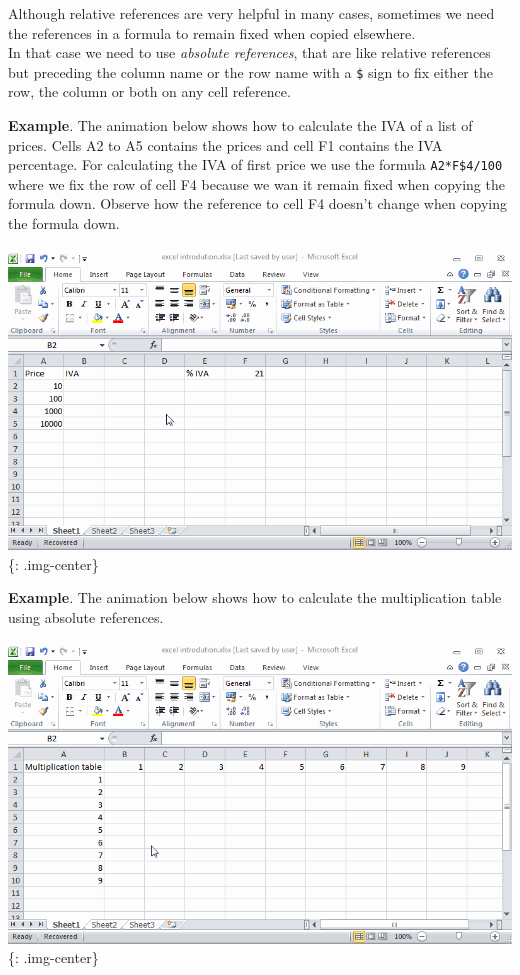 Although relative references are very helpful in many cases, sometimes we need the references in a formula to remain fixed when copied elsewhere.\\
In that case we need to use \emph{absolute references}, that are like relative references but preceding the column name or the row name with a \texttt{\$} sign to fix either the row, the column or both on any cell reference.

\textbf{Example}. The animation below shows how to calculate the IVA of a list of prices. Cells A2 to A5 contains the prices and cell F1 contains the IVA percentage. For calculating the IVA of first price we use the formula \texttt{A2*F\$4\slash 100} where we fix the row of cell F4 because we wan it remain fixed when copying the formula down. Observe how the reference to cell F4 doesn't change when copying the formula down. 

\includegraphics[keepaspectratio,width=\textwidth,height=0.75\textheight]{img/example_copying_formulas_with_absolute_references.gif}
\{: .img-center\}

\textbf{Example}. The animation below shows how to calculate the multiplication table using absolute references. 

\includegraphics[keepaspectratio,width=\textwidth,height=0.75\textheight]{img/example_multiplication_table.gif}
\{: .img-center\}

